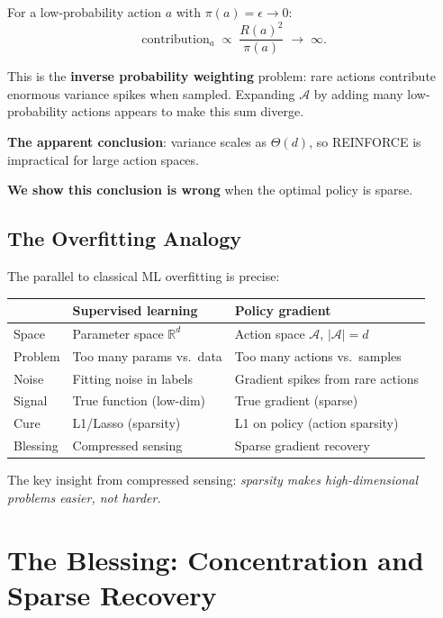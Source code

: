 \documentclass[11pt,a4paper]{article}
\newcommand{\R}{\mathbb{R}}
\begin{document}
For a low-probability action $a$ with $\pi(a) = \epsilon \to 0$:
\begin{equation}
  \text{contribution}_a \;\propto\; \frac{R(a)^2}{\pi(a)} \;\to\; \infty.
\end{equation}

This is the \textbf{inverse probability weighting} problem: rare actions
contribute enormous variance spikes when sampled. Expanding $\mathcal{A}$
by adding many low-probability actions appears to make this sum diverge.

\textbf{The apparent conclusion}: variance scales as $\Theta(d)$, so
REINFORCE is impractical for large action spaces.

\textbf{We show this conclusion is wrong} when the optimal policy is sparse.


\subsection{The Overfitting Analogy}

The parallel to classical ML overfitting is precise:

\begin{center}
\begin{tabular}{lll}
\hline
& \textbf{Supervised learning} & \textbf{Policy gradient} \\
\hline
Space     & Parameter space $\R^d$ & Action space $\mathcal{A}$, $|\mathcal{A}| = d$ \\
Problem   & Too many params vs.\ data & Too many actions vs.\ samples \\
Noise     & Fitting noise in labels & Gradient spikes from rare actions \\
Signal    & True function (low-dim) & True gradient (sparse) \\
Cure      & L1/Lasso (sparsity) & L1 on policy (action sparsity) \\
Blessing  & Compressed sensing & Sparse gradient recovery \\
\hline
\end{tabular}
\end{center}

The key insight from compressed sensing: \emph{sparsity makes
high-dimensional problems easier, not harder.}


\section{The Blessing: Concentration and Sparse Recovery}
\end{document}

